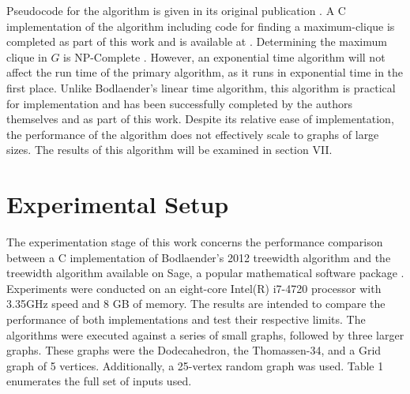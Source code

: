 \documentclass[12pt,conference]{IEEEtran}
\theoremstyle{plain}
\begin{document}
Pseudocode for the algorithm is given in its original publication \cite{bodlaender-2012}. A C implementation of the algorithm including code for finding a maximum-clique is completed as part of this work and is available at \cite{project-github}. Determining the maximum clique in $G$ is NP-Complete \cite{max-clique-npc}. However, an exponential time algorithm will not affect the run time of the primary algorithm, as it runs in exponential time in the first place. Unlike Bodlaender's linear time algorithm, this algorithm is practical for implementation and has been successfully completed by the authors themselves and as part of this work. Despite its relative ease of implementation, the performance of the algorithm does not effectively scale to graphs of large sizes. The results of this algorithm will be examined in section VII.


\section{Experimental Setup}
  
The experimentation stage of this work concerns the performance comparison between a C implementation of Bodlaender's 2012 treewidth algorithm and the treewidth algorithm available on Sage, a popular mathematical software package \cite{sage-original}. Experiments were conducted on an eight-core Intel(R) i7-4720 processor with 3.35GHz speed and 8 GB of memory. The results are intended to compare the performance of both implementations and test their respective limits. The algorithms were executed against a series of small graphs, followed by three larger graphs. These graphs were the Dodecahedron, the Thomassen-34, and a Grid graph of 5 vertices. Additionally, a 25-vertex random graph was used. Table 1 enumerates the full set of inputs used.
\end{document}
